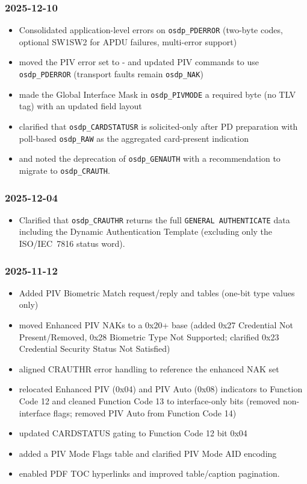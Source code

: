 \subsubsection*{2025-12-10}
\begin{itemize}
  \item Consolidated application-level errors on \texttt{osdp\_PDERROR} (two-byte codes, optional
    SW1\textbar SW2 for APDU failures, multi-error support)
  \item moved the PIV error set to - and updated PIV commands to use
    \texttt{osdp\_PDERROR} (transport faults remain \texttt{osdp\_NAK})
  \item made the Global Interface Mask in \texttt{osdp\_PIVMODE} a required byte (no TLV tag) with
    an updated field layout
  \item clarified that \texttt{osdp\_CARDSTATUSR} is solicited-only after PD preparation with
    poll-based \texttt{osdp\_RAW} as the aggregated card-present indication
  \item and noted the deprecation of \texttt{osdp\_GENAUTH} with a recommendation to migrate to
    \texttt{osdp\_CRAUTH}.
\end{itemize}

\subsubsection*{2025-12-04}
\begin{itemize}
  \item Clarified that \texttt{osdp\_CRAUTHR} returns the full \texttt{GENERAL AUTHENTICATE} data
    including the Dynamic Authentication Template (excluding only the ISO/IEC~7816 status word).
\end{itemize}

\subsubsection*{2025-11-12}
\begin{itemize}
  \item Added PIV Biometric Match request/reply and tables (one-bit type values only)
  \item moved Enhanced PIV NAKs to a 0x20+ base (added 0x27 Credential Not Present/Removed, 0x28
    Biometric Type Not Supported; clarified 0x23 Credential Security Status Not Satisfied)
  \item aligned CRAUTHR error handling to reference the enhanced NAK set
  \item relocated Enhanced PIV (0x04) and PIV Auto (0x08) indicators to Function Code 12 and cleaned
    Function Code 13 to interface-only bits (removed non-interface flags; removed PIV Auto from
    Function Code 14)
  \item updated CARDSTATUS gating to Function Code 12 bit 0x04
  \item added a PIV Mode Flags table and clarified PIV Mode AID encoding
  \item enabled PDF TOC hyperlinks and improved table/caption pagination.
\end{itemize}

